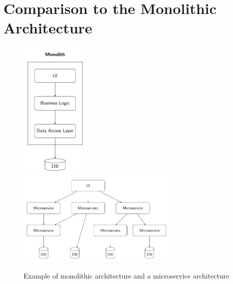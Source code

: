 \section{Comparison to the Monolithic Architecture}
\begin{figure}
    \centering
    \includegraphics[width=0.3\textwidth]{./images/microservice_architecture/TikZ_Monolith.pdf}
    \includegraphics[width=0.69\textwidth]{./images/microservice_architecture/TikZ_Microservice.pdf}
    \caption{Example of monolithic architecture and a microservice architecture~\cite{kalske2017challenges}}
    \label{fig:monolithvsmicroservice}
\end{figure}

